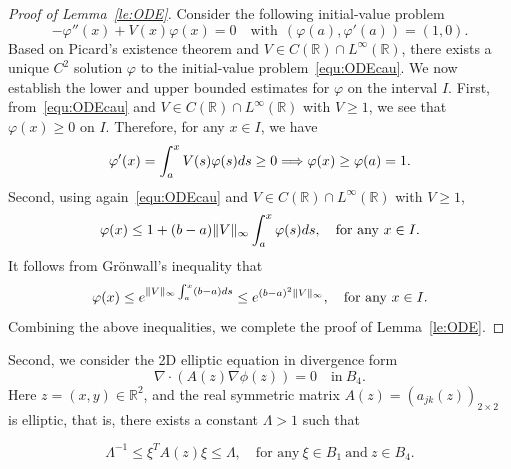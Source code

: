\documentclass[a4paper,reqno]{amsart}
\theoremstyle{definition}
\numberwithin{equation}{section}
\newcommand{\R}{\mathbb{R}}
\def \R {{\mathbb{R} }}
\def \d {{\rm{d}}}
\begin{document}
\begin{proof}[Proof of Lemma~\ref{le:ODE}]
Consider the following initial-value problem 
\begin{equation}\label{equ:ODEcau}
-\varphi''(x)+V(x)\varphi(x)=0\quad \mbox{with}\ \ 
(\varphi(a),\varphi'(a))=(1,0).
\end{equation}
Based on Picard's existence theorem and $V\in C(\R)\cap L^{\infty}(\R)$, there exists a unique $C^{2}$ solution $\varphi$ to the initial-value problem~\eqref{equ:ODEcau}. We now establish the lower and upper bounded estimates for $\varphi$ on the interval $I$. First, from~\eqref{equ:ODEcau} and $V\in C(\R)\cap L^{\infty}(\R)$ with $V\ge 1$, we see that $\varphi(x)\ge 0$ on $I$. Therefore, for any $x\in I$, we have 
\begin{equation*}
\varphi'(x)=\int_{a}^{x}V(s)\varphi(s)\d s\ge 0\Longrightarrow
\varphi(x)\ge \varphi(a)=1.
\end{equation*}
Second, using again~\eqref{equ:ODEcau} and $V\in C(\R)\cap L^{\infty}(\R)$ with $V\ge 1$,
\begin{equation*}
\varphi(x)\le 1+ (b-a)\|V\|_{\infty}\int_{a}^{x}\varphi(s)\d s,\quad \mbox{for any}\ x\in I.
\end{equation*}
It follows from Grönwall's inequality that
\begin{equation*}
\varphi(x)\le e^{\|V\|_{\infty}\int_{a}^{x}(b-a)\d s}\le e^{(b-a)^{2}\|V\|_{{\infty}}},\quad \mbox{for any}\ x\in I.
\end{equation*}
Combining the above inequalities, we complete the proof of Lemma~\ref{le:ODE}.
\end{proof}

Second, we consider the 2D elliptic equation in divergence form
\begin{equation}\label{equ:2Dell}
\nabla \cdot \left(A(z)\nabla \phi(z)\right)=0\quad \mbox{in} \ B_{4}.
\end{equation}
Here $z=(x,y)\in \R^{2}$, and the real symmetric matrix $A(z)=(a_{jk}(z))_{2\times2}$ is elliptic, that is, there exists a constant $\Lambda>1$ such that  

\begin{equation}\label{est:ell}
\Lambda^{-1}\le \xi^{T}A(z)\xi\le \Lambda,\quad \mbox{for any}\ \xi\in B_{1} \ \mbox{and}\ z\in B_{4}.
\end{equation}
\end{document}
